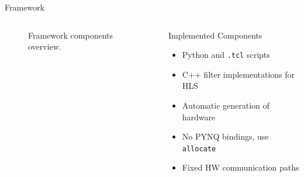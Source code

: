 \documentclass[aspectratio=169,t,xcolor={dvipsnames}]{beamer}
\begin{document}
\begin{frame}{Framework}
\begin{columns}[T]
\begin{column}{.45\textwidth}
\begin{figure}[h]
{
}
    \caption{Framework components overview.}%
    \label{fig:approach}%
\end{figure}
        \end{column}
        \begin{column}{.5\textwidth}
            \begin{block}{Implemented Components}
                \begin{itemize}
                    \item Python and \texttt{.tcl} scripts
                    \item C++ filter implementations for HLS
                    \item Automatic generation of hardware
                    \item No PYNQ bindings, use \texttt{allocate}
                    \item Fixed HW communication paths
                \end{itemize}
            \end{block}
        \end{column}
    \end{columns}
\end{frame}
\end{document}
